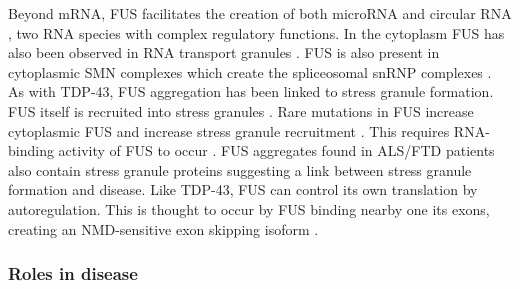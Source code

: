 Beyond mRNA, FUS facilitates the creation of both microRNA \citep{Morlando2012} and circular RNA \citep{Errichelli2017}, two RNA species with complex regulatory functions.
In the cytoplasm FUS has also been observed in RNA transport granules \citep{Kanai2004, Fujii2005}.
FUS is also present in cytoplasmic SMN complexes which create the spliceosomal snRNP complexes  \citep{Yamazaki2012,Groen2013}.
As with TDP-43, FUS aggregation has been linked to stress granule formation.
FUS itself is recruited into stress granules \citep{Andersson2008,Yasuda2013}. 
Rare mutations in FUS increase cytoplasmic FUS and increase stress granule recruitment \citep{Dormann2010, Bosco2010}.
This requires RNA-binding activity of FUS to occur \citep{Daigle2013}.
FUS aggregates found in ALS/FTD patients also contain stress granule proteins \citep{Dormann2010} suggesting a link between stress granule formation and disease.
Like TDP-43, FUS can control its own translation by autoregulation.
This is thought to occur by FUS binding nearby one its exons, creating an NMD-sensitive exon skipping isoform \citep{Zhou2013}.



\subsubsection{Roles in disease}


